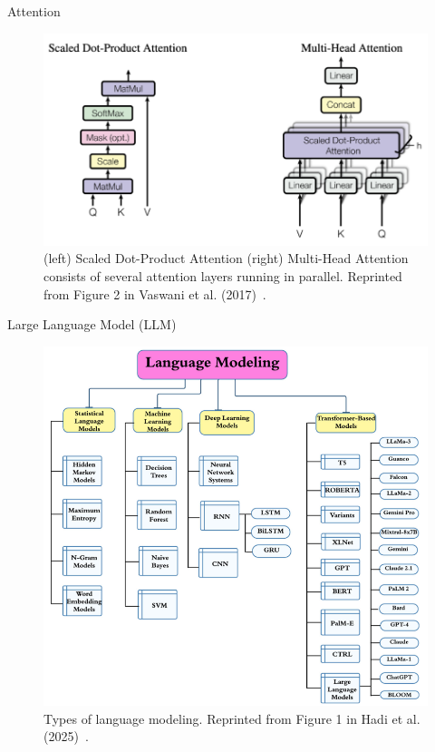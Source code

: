 \documentclass[12pt]{beamer}
\begin{document}
\begin{frame}[allowframebreaks]{Attention}
    \begin{figure}
        \centering
        \includegraphics[height=0.6\textheight]{figures/attention.png}
        \caption{(left) Scaled Dot-Product Attention (right) Multi-Head Attention consists of several attention layers running in parallel. Reprinted from Figure 2 in Vaswani et al. (2017)~\cite{vaswani2017attention}.}
        \label{fig:Fig. 2}
    \end{figure}
\end{frame}

\begin{frame}[allowframebreaks]{Large Language Model (LLM)}
    \begin{figure}
        \centering
        \includegraphics[height=0.6\textheight]{figures/lm_taxonomy.png}
        \caption{Types of language modeling. Reprinted from Figure 1 in Hadi et al. (2025)~\cite{Hadi_2025}.}
        \label{fig:Fig. 3}
    \end{figure}
\end{frame}
\end{document}
